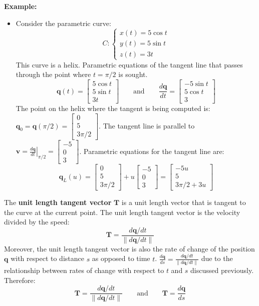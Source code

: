 \documentclass{article}
\begin{document}
\textbf{Example:}
\begin{itemize}
\item Consider the parametric curve:
\[C: \left\{\begin{array}{c} 
x(t) = 5 \cos t \\  
y(t) = 5 \sin t \\ 
z(t) = 3t 
\end{array}\right.\]
This curve is a helix. Parametric equations of the tangent line that passes through the point where \(t = \pi/2\) is sought.
\[\mathbf{q}(t) = \begin{bmatrix}
5 \cos t \\  
5 \sin t \\ 
3t 
\end{bmatrix} \quad\quad\text{and}\quad\quad \frac{d\mathbf{q}}{dt} = \begin{bmatrix}
-5 \sin t \\  
5 \cos t \\ 
3  
\end{bmatrix}\]
The point on the helix where the tangent is being computed is: \(\mathbf{q}_0 = \mathbf{q}(\pi/2) = \begin{bmatrix} 0 \\ 5 \\ 3\pi/2 \end{bmatrix}\). The tangent line is parallel to \(\mathbf{v} = \left.\frac{d\mathbf{q}}{dt}\right|_{\pi/2} = \begin{bmatrix} -5 \\ 0 \\ 3 \end{bmatrix}\). Parametric equations for the tangent line are:
\[\mathbf{q}_L(u) = \begin{bmatrix} 0 \\ 5 \\ 3\pi/2 \end{bmatrix} + u \begin{bmatrix} -5 \\ 0 \\ 3 \end{bmatrix} = \begin{bmatrix} -5u \\ 5 \\ 3\pi/2 + 3u \end{bmatrix}\]
\end{itemize}

\vspace{5mm} 

The {\bf unit length tangent vector} \(\mathbf{T}\) is a unit length vector that is tangent to the curve at the current point. The unit length tangent vector is the velocity divided by the speed:
\[\mathbf{T} = \frac{d\mathbf{q}/dt}{\|d\mathbf{q}/dt\|}\]
Moreover, the unit length tangent vector is also the rate of change of the position \(\mathbf{q}\) with respect to distance \(s\) as opposed to time \(t\). \(\frac{d\mathbf{q}}{ds} = \frac{d\mathbf{q}/dt}{\|d\mathbf{q}/dt\|}\) due to the relationship between rates of change with respect to \(t\) and \(s\) discussed previously. Therefore:
\[\mathbf{T} = \frac{d\mathbf{q}/dt}{\|d\mathbf{q}/dt\|} \quad\quad\text{and}\quad\quad \mathbf{T} = \frac{d\mathbf{q}}{ds}\] 
\end{document}
